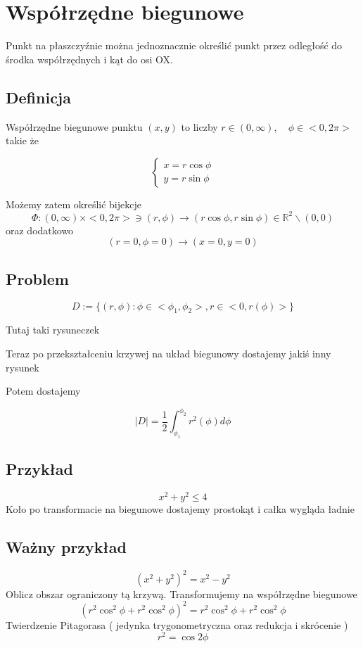 \documentclass[11pt]{article}
\begin{document}
\section{Współrzędne biegunowe}
Punkt na płaszczyźnie można jednoznacznie określić punkt przez odległość do środka współrzędnych i kąt do osi OX.

\subsection{Definicja}
Współrzędne biegunowe punktu $(x,y)$ to liczby $ r \in (0, \infty) , \quad \phi \in <0,2 \pi>$ takie że

\begin{displaymath}
\begin{cases}
x = r \cos{\phi} \\
y = r \sin{\phi}
\end{cases}
\end{displaymath}

Możemy zatem określić bijekcje 
$$ \Phi : (0,\infty) \times <0,2\pi> \ni (r,\phi) \to ( r \cos{\phi} , r \sin{\phi}) \in \mathbb{R}^2 \backslash {(0,0)}$$
oraz dodatkowo 
$$(r = 0 , \phi = 0) \to (x = 0 , y = 0)$$

\subsection{Problem}
$$ D := \{ (r,\phi) : \phi \in <\phi_1,\phi_2> , r \in <0,r(\phi)> \} $$

Tutaj taki rysuneczek 
\bigskip

Teraz po przekształceniu krzywej na układ biegunowy dostajemy jakiś inny rysunek

Potem dostajemy

$$ |D| = \frac{1}{2} \int_{\phi_1}^{\phi_2} r^2(\phi)d\phi$$

\subsection{Przykład}
$$x^2 + y^2 \leq 4$$
Koło po transformacie na biegunowe dostajemy prostokąt i całka wygląda ładnie

\subsection{Ważny przykład}
$$(x^2 + y^2)^2 = x^2 - y^2 $$
Oblicz obszar ograniczony tą krzywą.
Transformujemy na współrzędne biegunowe
$$ (r^2 \cos^2{\phi} + r^2 \cos^2{\phi})^2 = r^2 \cos^2{\phi} + r^2 \cos^2{\phi} $$
Twierdzenie Pitagorasa ( jedynka trygonometryczna oraz redukcja i skrócenie )
$$ r^2 = \cos{2\phi}$$
\end{document}
